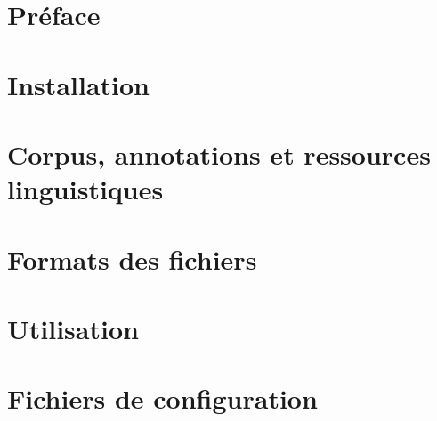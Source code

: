\documentclass[12pt]{article}
\title{\SEMFull}
\date{}
\begin{document}
    \maketitle
    
    \tableofcontents
    \newpage
    
    \section{Préface}
    
    
    \section{Installation}
    
    
    \section{Corpus, annotations et ressources linguistiques}
    
    
    \section{Formats des fichiers}
    
    
    \section{Utilisation}
    
    
    \section{Fichiers de configuration}
    
    
    
    
\end{document}
